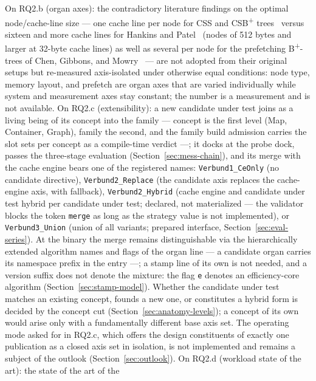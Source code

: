 \begin{nurlang}
On RQ2.b (organ axes): the contradictory literature findings on the optimal node/cache-line size
--- one cache line per node for CSS and CSB\textsuperscript{+} trees~\cite{rao1999css,rao2000csb}
versus sixteen and more cache lines for Hankins and Patel~\cite{hankins2003nodesize} (nodes of
512 bytes and larger at 32-byte cache lines) as well as several per node for the prefetching
B\textsuperscript{+}-trees of Chen, Gibbons, and Mowry~\cite{chen2001prefetch} --- are not adopted
from their original setups but re-measured axis-isolated under otherwise equal conditions: node
type, memory layout, and prefetch are organ axes that are varied individually while system and
measurement axes stay constant; the number is a measurement and is not available. On RQ2.c
(extensibility): a new candidate under test joins as a living being of its concept into the family --- concept is the
first level (Map, Container, Graph), family the second, and the family build admission carries the
slot sets per concept as a compile-time verdict ---; it docks at the probe dock, passes the
three-stage evaluation (Section~\ref{sec:mess-chain}), and its merge with the cache engine bears
one of the registered names: \texttt{Verbund1\_CeOnly} (no candidate directive),
\texttt{Verbund2\_Replace} (the candidate axis replaces the cache-engine axis, with fallback),
\texttt{Verbund2\_Hybrid} (cache engine and candidate under test hybrid per candidate under test; declared, not materialized ---
the validator blocks the token \texttt{merge} as long as the strategy value is not implemented), or
\texttt{Verbund3\_Union} (union of all variants; prepared interface,
Section~\ref{sec:eval-series}). At the binary the merge remains distinguishable via the
hierarchically extended algorithm names and flags of the organ line --- a candidate organ carries its
namespace prefix in the entry ---; a stamp line of its own is not needed, and a version suffix does
not denote the mixture: the flag \texttt{e} denotes an efficiency-core algorithm
(Section~\ref{sec:stamp-model}). Whether the candidate under test matches an existing concept, founds a new one, or
constitutes a hybrid form is decided by the concept cut (Section~\ref{sec:anatomy-levels}); a concept
of its own would arise only with a fundamentally different base axis set. The operating mode asked
for in RQ2.c, which offers the design constituents of exactly one publication as a closed axis set
in isolation, is not implemented and remains a subject of the outlook
(Section~\ref{sec:outlook}). On RQ2.d (workload state of the art): the state of the art of the

\end{nurlang}
